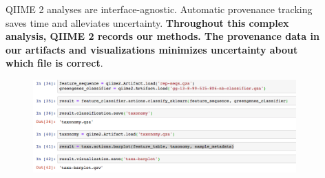 \documentclass[final]{beamer}
\newlength{\sepwidth}
\newlength{\colwidth}
\newcommand{\separatorcolumn}{\begin{column}{\sepwidth}\end{column}}
\begin{document}
\begin{frame}[t]
\begin{columns}[t]
\begin{column}{\colwidth}
\begin{block}{QIIME 2 analyses are interface-agnostic. Automatic provenance tracking saves time and alleviates uncertainty.}
    \textbf{Throughout this complex analysis, QIIME 2 records our methods.
    The provenance data in our artifacts and visualizations minimizes
    uncertainty about which file is correct}.

    \begin{figure}[tph!]
      {\includegraphics[width=25cm]{assets/taxabar}}
    \end{figure}

  \end{block}

\end{column}

\separatorcolumn

\begin{column}{\colwidth}


\end{column}
\end{columns}
\end{frame}
\end{document}
